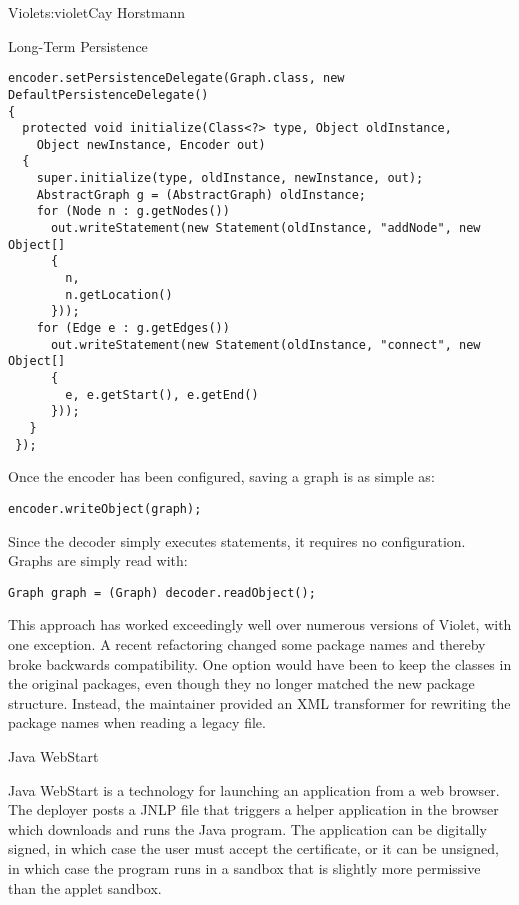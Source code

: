 \begin{aosachapter}{Violet}{s:violet}{Cay Horstmann}
\begin{aosasect1}{Long-Term Persistence}
\begin{verbatim}
encoder.setPersistenceDelegate(Graph.class, new DefaultPersistenceDelegate()
{
  protected void initialize(Class<?> type, Object oldInstance, 
    Object newInstance, Encoder out)
  {
    super.initialize(type, oldInstance, newInstance, out);
    AbstractGraph g = (AbstractGraph) oldInstance;
    for (Node n : g.getNodes())
      out.writeStatement(new Statement(oldInstance, "addNode", new Object[]
      {
        n, 
        n.getLocation()
      }));
    for (Edge e : g.getEdges())
      out.writeStatement(new Statement(oldInstance, "connect", new Object[]
      {
        e, e.getStart(), e.getEnd()
      }));
   } 
 });
\end{verbatim}

Once the encoder has been configured, saving a graph is as simple as:

\begin{verbatim}
encoder.writeObject(graph);
\end{verbatim}

\noindent Since the decoder simply executes statements, it requires no
configuration.  Graphs are simply read with:

\begin{verbatim}
Graph graph = (Graph) decoder.readObject();
\end{verbatim}

This approach has worked exceedingly well over numerous versions of
Violet, with one exception. A recent refactoring changed
some package names and thereby broke backwards compatibility.
One option would have been to keep the classes in the original packages,
even though they no longer matched the new package structure.
Instead, the maintainer provided an XML
transformer for rewriting the package names when reading a legacy
file.

\end{aosasect1}

\begin{aosasect1}{Java WebStart}

Java WebStart is a technology for launching an application from a web
browser. The deployer posts a JNLP file that triggers a helper
application in the browser which downloads and runs the Java
program. The application can be digitally signed, in which case the
user must accept the certificate, or it can be unsigned, in which case
the program runs in a sandbox that is slightly more permissive than
the applet sandbox.


\end{aosasect1}
\end{aosachapter}
